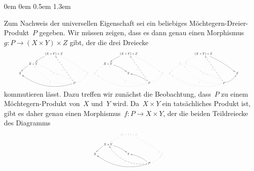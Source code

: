 \documentclass[a4paper,ngerman]{scrartcl}
\theoremstyle{definition}
\theoremstyle{plain}
\theoremstyle{remark}
\begin{document}
\begin{list}{}{0em \leftmargin0em \itemindent0.5em \itemsep 1.3em}
\begin{enumerate}
\newcommand{\hil}[1]{\color{black}{#1}}

Zum Nachweis der universellen Eigenschaft sei ein beliebiges
Möchtegern-Dreier-Produkt~$P$ gegeben. Wir müssen zeigen, dass es dann genau
einen Morphismus~$g : P \to (X \times Y) \times Z$ gibt, der die drei Dreiecke
\begin{equation}\label{diags}
  \scalebox{0.45}{\color{grey}{
    $\vcenter{\xymatrix@=4ex{
      && \hil{(X \times Y) \times Z} \ar@/_/@[black][dl] \ar@/^/[ddrr] \\
     & \hil{X \times Y} \ar@/_/@[black][ld] \ar@/^/[rd] && \text{$\phantom{X \times Y}$} \\
     \hil{X} && Y && Z \\
     &&& \hil{P}
      \ar@/^2pc/@{-->}[lluu]^f
      \ar@/^2pc/@[black][lllu] \ar@/_/[lu] \ar@/_/[ru]
      \ar@{-->}@[black][luuu]^g
    }}
    \quad
    \vcenter{\xymatrix@=4ex{
      && \hil{(X \times Y) \times Z} \ar@/_/@[black][dl] \ar@/^/[ddrr] \\
     & \hil{X \times Y} \ar@/_/[ld] \ar@/^/@[black][rd] && \text{$\phantom{X \times Y}$} \\
     X && \hil{Y} && Z \\
     &&& \hil{P}
      \ar@/^2pc/@{-->}[lluu]^f
      \ar@/^2pc/[lllu] \ar@/_/@[black][lu] \ar@/_/[ru]
      \ar@{-->}@[black][luuu]^g
    }}
    \quad
    \vcenter{\xymatrix@=4ex{
      && \hil{(X \times Y) \times Z} \ar@/_/[dl] \ar@/^/@[black][ddrr] \\
     & X \times Y \ar@/_/[ld] \ar@/^/[rd] && \text{$\phantom{X \times Y}$} \\
     X && Y && \hil{Z} \\
     &&& \hil{P}
      \ar@/^2pc/@{-->}[lluu]^f
      \ar@/^2pc/[lllu] \ar@/_/[lu] \ar@/_/@[black][ru]
      \ar@{-->}@[black][luuu]^g
    }}$
  }}
\end{equation}
kommutieren lässt. Dazu treffen wir zunächst die Beobachtung, dass~$P$ zu einem
Möchtegern-Produkt von~$X$ und~$Y$ wird. Da~$X \times Y$ ein tatsächliches
Produkt ist, gibt es daher genau einen Morphismus~$f: P \to X \times Y$, der
die beiden Teildreiecke des Diagramms
\[
  \scalebox{0.45}{\color{grey}{\xymatrix@=4ex{
    && (X \times Y) \times Z \ar@/_/[dl] \ar@/^/[ddrr] \\
   & \hil{X \times Y} \ar@/_/@[black][ld] \ar@/^/@[black][rd] && \text{$\phantom{X \times Y}$} \\
   \hil{X} && \hil{Y} && Z \\
   &&& \hil{P}
    \ar@/^2pc/@{-->}@[black][lluu]^f
    \ar@/^2pc/@[black][lllu] \ar@/_/@[black][lu] \ar@/_/[ru]
}}}\]
\end{enumerate}
\end{list}
\end{document}
